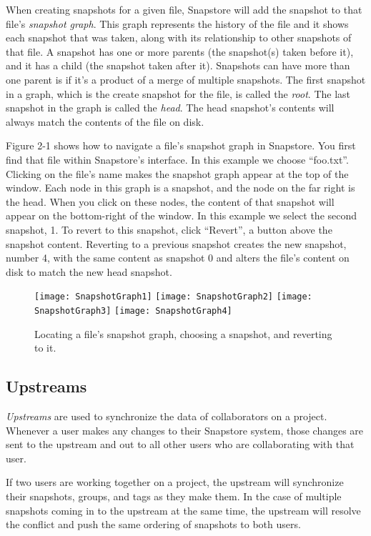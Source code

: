 When creating snapshots for a given file, Snapstore will add the snapshot to that file's \textit{snapshot graph}. This graph represents the history of the file and it shows each snapshot that was taken, along with its relationship to other snapshots of that file. A snapshot has one or more parents (the snapshot(s) taken before it), and it has a child (the snapshot taken after it). Snapshots can have more than one parent is if it's a product of a merge of multiple snapshots. The first snapshot in a graph, which is the create snapshot for the file, is called the \textit{root}. The last snapshot in the graph is called the \textit{head}. The head snapshot's contents will always match the contents of the file on disk.

Figure 2-1 shows how to navigate a file's snapshot graph in Snapstore. You first find that file within Snapstore's interface. In this example we choose ``foo.txt''. Clicking on the file's name makes the snapshot graph appear at the top of the window. Each node in this graph is a snapshot, and the node on the far right is the head. When you click on these nodes, the content of that snapshot will appear on the bottom-right of the window. In this example we select the second snapshot, 1. To revert to this snapshot, click ``Revert'', a button above the snapshot content. Reverting to a previous snapshot creates the new snapshot, number 4, with the same content as snapshot 0 and alters the file's content on disk to match the new head snapshot.

\begin{figure}
\texttt{[image: SnapshotGraph1]}
\texttt{[image: SnapshotGraph2]}
\texttt{[image: SnapshotGraph3]}
\texttt{[image: SnapshotGraph4]}
\caption{Locating a file's snapshot graph, choosing a snapshot, and reverting to it.}
\label{arm:fig1}
\end{figure}

\subsection{Upstreams}

\textit{Upstreams} are used to synchronize the data of collaborators on a project. Whenever a user makes any changes to their Snapstore system, those changes are sent to the upstream and out to all other users who are collaborating with that user.

If two users are working together on a project, the upstream will synchronize their snapshots, groups, and tags as they make them. In the case of multiple snapshots coming in to the upstream at the same time, the upstream will resolve the conflict and push the same ordering of snapshots to both users.


